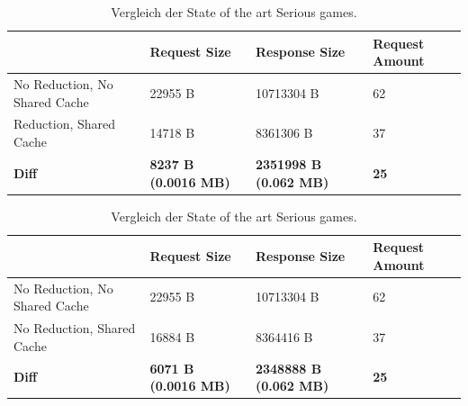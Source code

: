 \begin{table}[]
    \begin{tabular}{|l|l|l|l|}
    \hline
                                    & Request Size & Response Size & Request Amount  \\
    \hline
     No Reduction, No Shared Cache     &  22955 B        &  10713304 B   & 62 \\
     \hline
     Reduction, Shared Cache        &  14718 B        &  8361306 B   & 37 \\
     \hline
    \textbf{Diff}                   & \textbf{8237 B (0.0016 MB)} & \textbf{2351998 B (0.062  MB)} & \textbf{25} \\
     \hline
    \end{tabular}
    \caption{Vergleich der State of the art Serious games.}
    \label{tab:serious-game-comparison}
\end{table}

\begin{table}[]
    \begin{tabular}{|l|l|l|l|}
    \hline
                                    & Request Size & Response Size & Request Amount  \\
    \hline
     No Reduction, No Shared Cache     &  22955 B        &  10713304 B   & 62 \\
     \hline
     No Reduction, Shared Cache        &  16884 B        &  8364416 B   & 37 \\
     \hline
    \textbf{Diff}                   & \textbf{6071 B (0.0016 MB)} & \textbf{2348888 B (0.062  MB)} & \textbf{25} \\
     \hline
    \end{tabular}
    \caption{Vergleich der State of the art Serious games.}
    \label{tab:serious-game-comparison}
\end{table}


